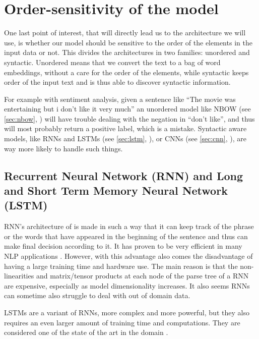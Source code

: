 \section{Order-sensitivity of the model}
One last point of interest, that will directly lead us to the architecture we will use, is whether our model should be sensitive to the order of the elements in the input data or not. This divides the architectures in two families: unordered and syntactic. Unordered means that we convert the text to a bag of word embeddings, without a care for the order of the elements, while syntactic keeps order of the input text and is thus able to discover syntactic information.

For example with sentiment analysis, given a sentence like “The movie was entertaining but i don't like it very much” an unordered model like NBOW (see \autoref{sec:nbow}, ) will have trouble dealing with the negation in “don't like”, and thus will most probably return a positive label, which is a mistake. Syntactic aware models, like RNNs and LSTMs (see \autoref{sec:lstm}, ), or CNNs (see \autoref{sec:cnn}, ), are way more likely to handle such things.

\subsection{Recurrent Neural Network (RNN) and Long and Short Term Memory Neural Network (LSTM)\label{sec:lstm}}
RNN’s architecture of is made in such a way that it can keep track of the phrase or the words  that have appeared in the beginning of the sentence and thus can make final decision according to it. It has proven to be very efficient in many NLP applications \cite{rnn_attention_lanl,UnreasonableRNN}.
However, with this advantage also comes the disadvantage of having a large training time and hardware use.
The main reason is that the non-linearities and matrix/tensor products at each node of the parse tree of a RNN are expensive, especially as model dimensionality increases. 
It also seems RNNs can sometime also struggle to deal with out of domain data.

LSTMs are a variant of RNNs, more complex and more powerful, but they also requires an even larger amount of training time and computations.
They are considered one of the state of the art in the domain \cite{LSTM}.

